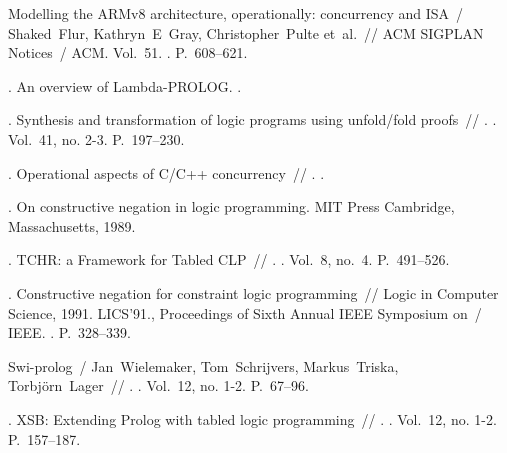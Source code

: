 \begin{thebibliography}{99}
Modelling the ARMv8 architecture, operationally: concurrency and ISA~/
  Shaked~Flur, Kathryn~E~Gray, Christopher~Pulte et~al.~// ACM SIGPLAN
  Notices~/ ACM. \BibDash
\newblock Vol.~51. \BibDash
{}. \BibDash
\newblock P.~608--621.

. An overview of Lambda-PROLOG. \BibDash
{}.

. Synthesis and transformation
  of logic programs using unfold/fold proofs~// . \BibDash
{}. \BibDash
\newblock Vol.~41, no. 2-3. \BibDash
\newblock P.~197--230.

. Operational
  aspects of C/C++ concurrency~// .
  \BibDash
{}.

. On constructive negation in logic programming.
  \BibDash
\newblock MIT Press Cambridge, Massachusetts, 1989.

. TCHR: a Framework for
  Tabled CLP~// . \BibDash
{}. \BibDash
\newblock Vol.~8, no.~4. \BibDash
\newblock P.~491--526.

. Constructive negation for constraint logic
  programming~// Logic in Computer Science, 1991. LICS'91., Proceedings of
  Sixth Annual IEEE Symposium on~/ IEEE. \BibDash
{}. \BibDash
\newblock P.~328--339.

Swi-prolog~/ Jan~Wielemaker, Tom~Schrijvers, Markus~Triska,
  Torbj{\"o}rn~Lager~// .
  \BibDash
{}. \BibDash
\newblock Vol.~12, no. 1-2. \BibDash
\newblock P.~67--96.

. XSB: Extending Prolog with tabled
  logic programming~// .
  \BibDash
{}. \BibDash
\newblock Vol.~12, no. 1-2. \BibDash
\newblock P.~157--187.


\end{thebibliography}
